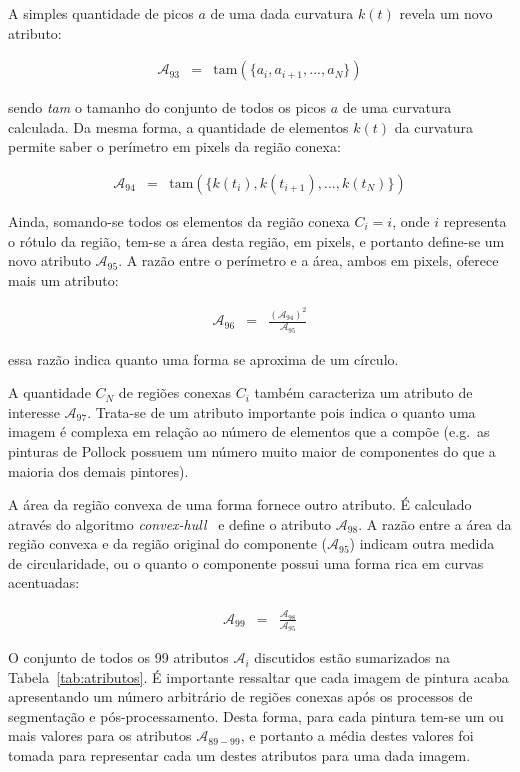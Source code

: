 A simples quantidade de picos $a$ de uma dada curvatura $k(t)$ revela um novo
atributo:

\begin{eqnarray}
  \mathcal{A}_{93} & = & \text{tam}(\{a_{i}, a_{i+1}, ..., a_{N}\})
\end{eqnarray}

\noindent sendo \textit{tam} o tamanho do conjunto de todos os picos $a$ de uma
curvatura calculada. Da mesma forma, a quantidade de elementos $k(t)$ da
curvatura permite saber o perímetro em pixels da região conexa:

\begin{eqnarray}
  \mathcal{A}_{94} & = & \text{tam}(\{k(t_{i}), k(t_{i+1}), ..., k(t_{N})\})
\end{eqnarray}

Ainda, somando-se todos os elementos da região conexa $C_i = i$, onde $i$
representa o rótulo da região, tem-se a área desta região, em pixels, e portanto
define-se um novo atributo $\mathcal{A}_{95}$. A razão entre o perímetro e a
área, ambos em pixels, oferece mais um atributo:

\begin{eqnarray}
  \mathcal{A}_{96} & = & \frac{(\mathcal{A}_{94})^2}{\mathcal{A}_{95}}
\end{eqnarray}

\noindent essa razão indica quanto uma forma se aproxima de um círculo.

A quantidade $C_N$ de regiões conexas $C_i$ também caracteriza um atributo de
interesse $\mathcal{A}_{97}$. Trata-se de um atributo importante pois indica o
quanto uma imagem é complexa em relação ao número de elementos que a compõe
(e.g.\ as pinturas de Pollock possuem um número muito maior de componentes do
que a maioria dos demais pintores).

A área da região convexa de uma forma fornece outro atributo. É calculado
através do algoritmo \textit{convex-hull}~\cite{luciano} e define o atributo
$\mathcal{A}_{98}$. A razão entre a área da região convexa e da região original
do componente ($\mathcal{A}_{95}$) indicam outra medida de circularidade, ou o
quanto o componente possui uma forma rica em curvas acentuadas:

\begin{eqnarray}
  \mathcal{A}_{99} & = & \frac{\mathcal{A}_{98}}{\mathcal{A}_{95}}
\end{eqnarray}

O conjunto de todos os 99 atributos $\mathcal{A}_i$ discutidos estão sumarizados na
Tabela~\ref{tab:atributos}. É importante ressaltar que cada imagem de pintura
acaba apresentando um número arbitrário de regiões conexas após os processos de
segmentação e pós-processamento. Desta forma, para cada pintura tem-se um ou
mais valores para os atributos $\mathcal{A}_{89-99}$, e portanto a média destes
valores foi tomada para representar cada um destes atributos para uma dada imagem.

